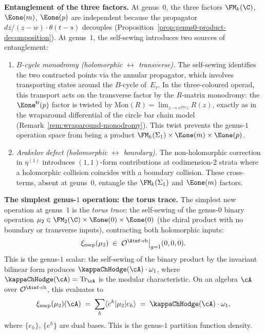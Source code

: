 \begin{construction}
\medskip\noindent
\textbf{Entanglement of the three factors.}
At genus~$0$, the three factors $\FM_k(\C)$, $\Eone(m)$,
$\Eone(p)$ are independent because the propagator
$dz/(z{-}w) \cdot \theta(t{-}s)$ decouples
(Proposition~\ref{prop:genus0-product-decomposition}).
At genus~$1$, the self-sewing introduces two
sources of entanglement:
\begin{enumerate}[label=\textup{(\roman*)}]
\item \emph{$B$-cycle monodromy (holomorphic $\leftrightarrow$
 transverse).}
 The self-sewing identifies the two contracted points
 via the annular propagator, which involves
 transporting states around the $B$-cycle of~$E_\tau$.
 In the three-coloured operad, this transport acts on
 the transverse factor by the $R$-matrix monodromy:
 the $\Eone^{\mathsf{tr}}(p)$ factor is twisted by
 $\mathrm{Mon}(R) = \lim_{z \to e^{2\pi i}z} R(z)$,
 exactly as in the wraparound differential of the circle
 bar chain model
 (Remark~\ref{rem:wraparound-monodromy}).
 This twist prevents the genus-$1$ operation space from
 being a product $\FM_k(\Sigma_1) \times \Eone(m)
 \times \Eone(p)$.
\item \emph{Arakelov defect (holomorphic $\leftrightarrow$
 boundary).}
 The non-holomorphic correction in $\eta^{(1)}$
 introduces $(1,1)$-form contributions at codimension-$2$
 strata where a holomorphic collision coincides with a
 boundary collision. These cross-terms, absent at
 genus~$0$, entangle the $\FM_k(\Sigma_1)$ and
 $\Eone(m)$ factors.
\end{enumerate}

\medskip\noindent
\textbf{The simplest genus-$1$ operation: the torus trace.}
The simplest new operation at genus~$1$ is the
\emph{torus trace}: the self-sewing of the genus-$0$
binary operation
$\mu_2 \in \FM_2(\C) \times \Eone(0) \times \Eone(0)$
(the chiral product with no boundary or transverse inputs),
contracting both holomorphic inputs:
\begin{equation}\label{eq:torus-trace-operation}
 \xi_{\mathrm{nsep}}(\mu_2)
 \;\in\;
 \mathcal{O}^{\Ainf\text{-ch}}\big|_{g=1}(0,0,0).
\end{equation}
This is the genus-$1$ scalar:
the self-sewing of the binary product by the
invariant bilinear form produces
$\kappaChHodge(\cA) \cdot \omega_1$, where
$\kappaChHodge(\cA) = \mathrm{Tr}_\cA$ is the modular
characteristic.
On an algebra $\cA$ over
$\mathcal{O}^{\Ainf\text{-ch}}$, this evaluates to
\[
 \xi_{\mathrm{nsep}}(\mu_2)(\cA)
 \;=\;
 \sum_h \langle e^h | \mu_2 | e_h \rangle
 \;=\;
 \kappaChHodge(\cA) \cdot \omega_1,
\]
where $\{e_h\}$, $\{e^h\}$ are dual bases. This is the
genus-$1$ partition function density.


\end{construction}
